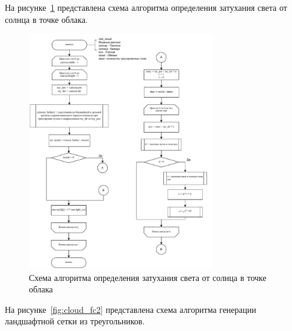 \clearpage
На рисунке~\ref{fig:cloud_fc1} представлена схема алгоритма определения затухания света от солнца в точке облака.
\begin{figure}[ht!]
	\centering
	\includegraphics[width=0.72\textwidth, page=2]{assets/img/cloud_flowchart.pdf}   
	\caption{Схема алгоритма определения затухания света от солнца в точке облака}
	\label{fig:cloud_fc1}
\end{figure}
\clearpage
На рисунке~\ref{fig:cloud_fc2} представлена схема алгоритма генерации ландшафтной сетки из треугольников.
